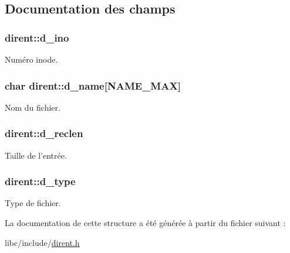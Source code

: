 \subsection{Documentation des champs}
\hypertarget{structdirent_a0ed2e5ea3c71500f628914bf3966e4ba}{
\subsubsection[{d\-\_\-ino}]{ dirent\-::d\-\_\-ino}}\label{structdirent_a0ed2e5ea3c71500f628914bf3966e4ba}
Numéro inode. \hypertarget{structdirent_a7b4cbd53dc600257b2746225c8a8f3be}{
\subsubsection[{d\-\_\-name}]{\setlength{\rightskip}{0pt plus 5cm}char dirent\-::d\-\_\-name\mbox{[}{\bf N\-A\-M\-E\-\_\-\-M\-A\-X}\mbox{]}}}\label{structdirent_a7b4cbd53dc600257b2746225c8a8f3be}
Nom du fichier. \hypertarget{structdirent_a7cc67dd4ba5a8bed7f107f249957688d}{
\subsubsection[{d\-\_\-reclen}]{ dirent\-::d\-\_\-reclen}}\label{structdirent_a7cc67dd4ba5a8bed7f107f249957688d}
Taille de l'entrée. \hypertarget{structdirent_a948760e3b7f607213a19f85e7af15a32}{
\subsubsection[{d\-\_\-type}]{ dirent\-::d\-\_\-type}}\label{structdirent_a948760e3b7f607213a19f85e7af15a32}
Type de fichier. 

La documentation de cette structure a été générée à partir du fichier suivant \-:\begin{DoxyCompactItemize}
\item 
libc/include/\hyperlink{dirent_8h}{dirent.\-h}\end{DoxyCompactItemize}
